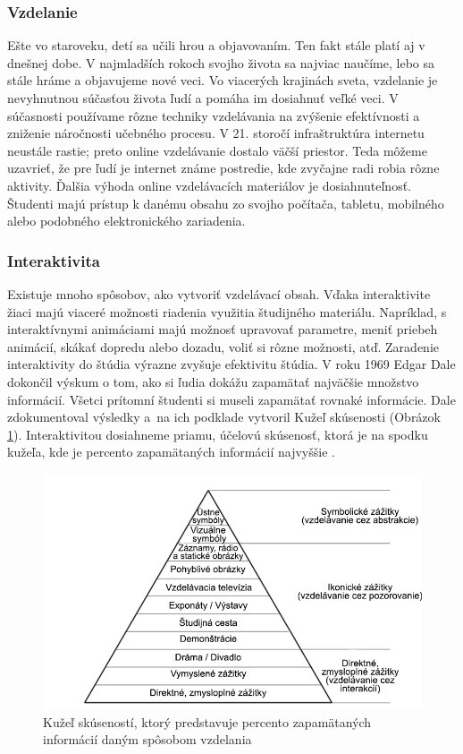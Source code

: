 \subsubsection{Vzdelanie}
Ešte vo staroveku, detí sa učili hrou a objavovaním. Ten fakt stále platí aj v dnešnej dobe. V najmladších rokoch svojho života sa najviac naučíme, lebo sa stále hráme a objavujeme nové veci. Vo viacerých krajinách sveta, vzdelanie je nevyhnutnou súčasťou života ľudí a pomáha im dosiahnuť veľké veci. V súčasnosti používame rôzne techniky vzdelávania na zvýšenie efektívnosti a zniženie náročnosti učebného procesu. V 21. storočí infraštruktúra internetu neustále rastie; preto online vzdelávanie dostalo väčší priestor. Teda môžeme uzavrieť, že pre ľudí je  internet známe postredie, kde zvyčajne radi robia rôzne aktivity. Ďalšia výhoda online vzdelávacích materiálov je dosiahnuteľnosť. Študenti majú prístup k danému obsahu zo svojho počítača, tabletu, mobilného alebo podobného elektronického zariadenia.

\subsubsection{Interaktivita}
Existuje mnoho spôsobov, ako vytvoriť vzdelávací obsah. Vďaka interaktivite žiaci majú viaceré možnosti riadenia využitia študijného materiálu. Napríklad, s interaktívnymi animáciami majú možnosť upravovať parametre, meniť priebeh animácií, skákať dopredu alebo dozadu,  voliť si rôzne možnosti, atď. Zaradenie interaktivity do štúdia výrazne zvyšuje efektivitu štúdia. V roku 1969 Edgar Dale dokončil výskum o tom, ako si ľudia dokážu zapamätať najväčšie množstvo informácií. Všetci prítomní študenti si museli zapamätať  rovnaké informácie. Dale zdokumentoval výsledky a na ich podklade  vytvoril Kužeľ skúsenosti (Obrázok \ref{CE}). Interaktivitou dosiahneme priamu, účelovú skúsenosť, ktorá je na spodku kužeľa, kde je percento zapamätaných informácií  najvyššie \cite{c15}.

\begin{figure}[!htbp]
    \centering
    \includegraphics[width=12cm]{img/Cone-of-Experience.png}
    \caption{Kužeľ skúseností, ktorý predstavuje percento zapamätaných informácií daným spôsobom vzdelania \cite{c15}}
    \label{CE}
\end{figure}

